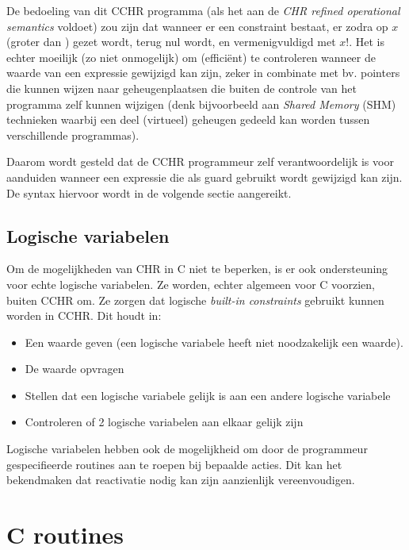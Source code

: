 De bedoeling van dit CCHR programma (als het aan de {\em CHR refined operational semantics} voldoet) zou zijn dat wanneer er een  constraint bestaat, er zodra  op $x$ (groter dan ) gezet wordt,  terug nul wordt, en  vermenigvuldigd met $x!$. Het is echter moeilijk (zo niet onmogelijk) om (effici\"ent) te controleren wanneer de waarde van een expressie gewijzigd kan zijn, zeker in combinate met bv. pointers die kunnen wijzen naar geheugenplaatsen die buiten de controle van het programma zelf kunnen wijzigen (denk bijvoorbeeld aan {\em Shared Memory} (SHM) technieken waarbij een deel (virtueel) geheugen gedeeld kan worden tussen verschillende programmas).

Daarom wordt gesteld dat de CCHR programmeur zelf verantwoordelijk is voor aanduiden wanneer een expressie die als guard gebruikt
wordt gewijzigd kan zijn. De syntax hiervoor wordt in de volgende sectie aangereikt.

\subsection{Logische variabelen}

Om de mogelijkheden van CHR in C niet te beperken, is er ook ondersteuning voor echte logische variabelen. Ze worden, echter
algemeen voor C voorzien, buiten CCHR om. Ze zorgen dat logische {\em built-in constraints} gebruikt kunnen worden in
CCHR. Dit houdt in: \begin{itemize}
  \item Een waarde geven (een logische variabele heeft niet noodzakelijk een waarde).
  \item De waarde opvragen
  \item Stellen dat een logische variabele gelijk is aan een andere logische variabele
  \item Controleren of 2 logische variabelen aan elkaar gelijk zijn
\end{itemize}

Logische variabelen hebben ook de mogelijkheid om door de programmeur gespecifieerde routines aan te roepen bij bepaalde acties. Dit kan het bekendmaken dat reactivatie nodig kan zijn aanzienlijk vereenvoudigen. 


\section{C routines} \label{taal:impl-crout}

